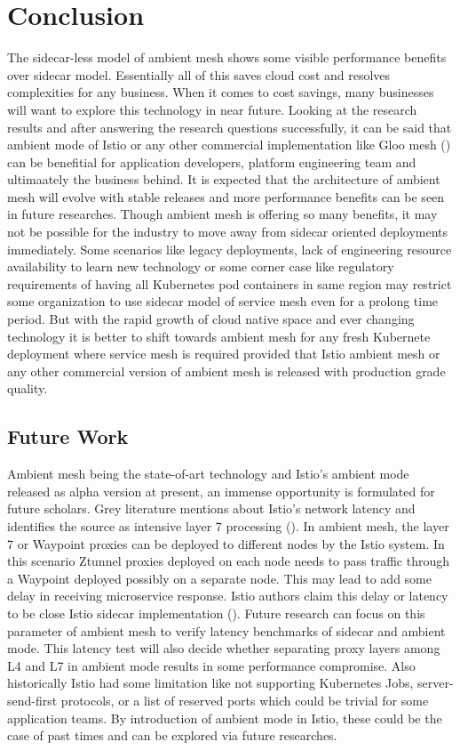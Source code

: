 \section{Conclusion}
The sidecar-less model of ambient mesh shows some visible performance benefits over sidecar model. Essentially all of this saves cloud cost and resolves complexities for any business. When it comes to cost savings, many businesses will want to explore this technology in near future. Looking at the research results and after answering the research questions successfully, it can be said that ambient mode of Istio or any other commercial implementation like Gloo mesh (\cite{glooMeshIntro}) can be benefitial for application developers, platform engineering team and ultimaately the business behind. It is expected that the architecture of ambient mesh will evolve with stable releases and more performance benefits can be seen in future researches. Though ambient mesh is offering so many benefits, it may not be possible for the industry to move away from sidecar oriented deployments immediately. Some scenarios like legacy deployments, lack of engineering resource availability to learn new technology or some corner case like regulatory requirements of having all Kubernetes pod containers in same region may restrict some organization to use sidecar model of service mesh even for a prolong time period. But with the rapid growth of cloud native space and ever changing technology it is better to shift towards ambient mesh for any fresh Kubernete deployment where service mesh is required provided that Istio ambient mesh or any other commercial version of ambient mesh is released with production grade quality.

\subsection{Future Work}
Ambient mesh being the state-of-art technology and Istio's ambient mode released as alpha version at present, an immense opportunity is formulated for future scholars. Grey literature mentions about Istio’s network latency and identifies the source as intensive layer 7 processing (\cite{istioHoward2022}). In ambient mesh, the layer 7 or Waypoint proxies can be deployed to different nodes by the Istio system. In this scenario Ztunnel proxies deployed on each node needs to pass traffic through a Waypoint deployed possibly on a separate node. This may lead to add some delay in receiving microservice response. Istio authors claim this delay or latency to be close Istio sidecar implementation (\cite{istioHoward2022}). Future research can focus on this parameter of ambient mesh to verify latency benchmarks of sidecar and ambient mode. This latency test will also decide whether separating proxy layers among L4 and L7 in ambient mode results in some performance compromise. Also historically Istio had some limitation like not supporting Kubernetes Jobs, server-send-first protocols, or a list of reserved ports which could be trivial for some application teams. By introduction of ambient mode in Istio, these could be the case of past times and can be explored via future researches.